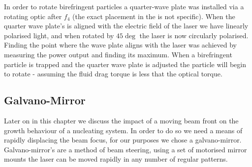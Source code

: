 In order to rotate birefringent particles a quarter-wave plate was
installed via a rotating optic after $f_4$ (the exact placement in the 
is not specific). When the quarter wave plate's is aligned with the 
electric field of the laser we have linearly polarised light, and when
rotated by $45\deg$ the laser is now circularly polarised. Finding 
the point where the wave plate aligns with the laser was achieved by
measuring the power output and finding its maximum. When a birefringent
particle is trapped and the quarter wave plate is adjusted the particle 
will begin to rotate - assuming the fluid drag torque is less that the 
optical torque. 

\subsection{Galvano-Mirror}
Later on in this chapter we discuss the impact of a moving beam front
on the growth behaviour of a nucleating system. In order to do so we
need a means of rapidly displacing the beam focus, for our purposes
we chose a galvano-mirror. Galvano-mirror's are a method of beam 
steering, using a set of motorised mirror mounts the laser can be 
moved rapidly in any number of regular patterns. 
